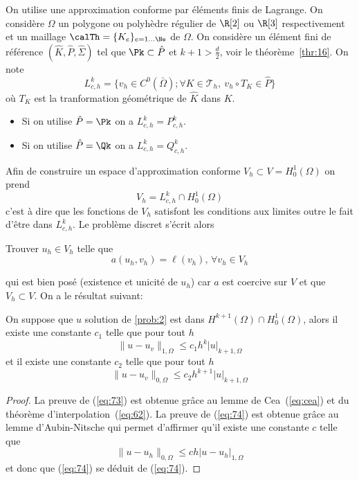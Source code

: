 On utilise une approximation conforme par éléments finis de Lagrange. On
considère $\Omega$ un polygone ou polyhèdre régulier de $\R[2]$ ou $\R[3]$
respectivement et un maillage $\calTh = \{K_e\}_{e=1...\Ne}$ de $\Omega$. On considère un élément
fini de référence $(\hat{K},\hat{P},\hat{\Sigma})$ tel que $\Pk \subset \hat{P}$
et $k+1 > \frac{d}{2}$, voir le théorème~\ref{thr:16}. On note
\begin{equation}
  \label{eq:70}
  L^k_{c,h} = \{ v_h \in C^0(\bar{\Omega}); \forall K \in \mathcal{T}_h,\ v_h
  \circ T_K \in \hat{P}\}
\end{equation}
où $T_K$ est la tranformation géométrique de $\hat{K}$ dans $K$.
\begin{itemize}
\item Si on utilise $\hat{P}=\Pk$ on a $L^k_{c,h} = P^k_{c,h}$.
\item Si on utilise $\hat{P}=\Qk$ on a $L^k_{c,h} = Q^k_{c,h}$.
\end{itemize}
Afin de construire un espace d'approximation conforme \ie $V_h \subset V
=H^1_0(\Omega)$ on prend
\begin{equation}
  \label{eq:71}
  V_h = L^k_{c,h} \cap H^1_0(\Omega)
\end{equation}
c'est à dire que les fonctions de $V_h$ satisfont les conditions aux limites
outre le fait d'être dans $L^k_{c,h}$. Le problème discret s'écrit alors
\begin{problem}
  \label{prob:6}
  Trouver $u_h \in V_h$ telle que
  \begin{equation}
    \label{eq:72}
    a(u_h,v_h) = \ell(v_h),\, \forall v_h \in V_h
  \end{equation}
\end{problem}
qui est bien posé (existence et unicité de $u_h$) car $a$ est coercive sur $V$
et que $V_h \subset V$. On a le résultat suivant:
\begin{theorem}[Convergence de $u_h$]
  \label{thr:17}
  On suppose que $u$ solution de \ref{prob:2} est dans $H^{k+1}(\Omega) \cap
  H^1_0(\Omega)$, alors il existe une constante $c_1$ telle que pour tout $h$
  \begin{equation}
    \label{eq:73}
    \|u-u_v\|_{1,\Omega} \le c_1 h^k |u|_{k+1,\Omega}
  \end{equation}
  et il existe une constante $c_2$ telle que pour tout $h$
  \begin{equation}
    \label{eq:74}
    \|u-u_v\|_{0,\Omega} \le c_2 h^{k+1} |u|_{k+1,\Omega}
  \end{equation}
\begin{proof}
  La preuve de (\ref{eq:73}) est obtenue grâce au lemme de Cea~(\ref{eq:cea})
  et du théorème d'interpolation~(\ref{eq:62}).
  La preuve de (\ref{eq:74}) est obtenue grâce au lemme d'Aubin-Nitsche qui
  permet d'affirmer qu'il existe une constante $c$ telle que
  \begin{equation}
    \label{eq:75}
    \|u-u_h\|_{0,\Omega} \leq c h |u-u_h|_{1,\Omega}
  \end{equation}
  et donc que (\ref{eq:74}) se déduit de (\ref{eq:74}).
\end{proof}
\end{theorem}

